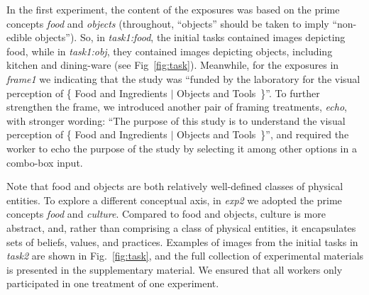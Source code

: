 \documentclass[12pt]{article}
\begin{document}
In the first experiment, the content of the exposures was based on the prime
concepts \textit{food} and \textit{objects} (throughout, ``objects'' should be
taken to imply ``non-edible objects'').  So, 
in \textit{task1:food}, the initial tasks contained images depicting food, 
while in \textit{task1:obj}, they contained images depicting objects, 
including kitchen and dining-ware (see Fig~\ref{fig:task}).  Meanwhile, 
for the exposures in \textit{frame1} we indicating that the study was
``funded by the laboratory for the visual perception of \{ Food and Ingredients
$\vert$ Objects and Tools~\}''.  To further strengthen the frame, we 
introduced another pair of framing treatments, \textit{echo}, with stronger
wording: ``The purpose of this study is to understand the visual perception
of \{ Food and Ingredients $\vert$ Objects and Tools~\}'', and required
the worker to echo the purpose of the study by selecting it among other 
options in a combo-box input.

Note that food and objects are both relatively well-defined classes of 
physical entities.  To explore a different conceptual axis, in 
\textit{exp2} we adopted the prime concepts \textit{food} and \textit{culture}.
Compared to food and objects, culture is more abstract, and, rather than 
comprising a class of physical entities, it encapsulates
sets of beliefs, values, and practices.  Examples of images from the initial 
tasks in \textit{task2} are shown in Fig.~\ref{fig:task}, and the full 
collection of 
experimental materials is presented in the supplementary material.  We 
ensured that all workers only participated in one treatment of one experiment.
\end{document}
